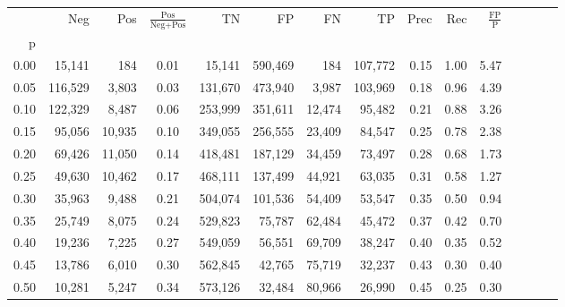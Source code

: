\begin{tabular}{rrrcrrrrrrrrrrr}
\toprule
{} &      Neg &     Pos & $\frac{\text{Pos}}{\text{Neg}+\text{Pos}}$ &       TN &       FP &       FN &       TP &  Prec &   Rec & $\frac{\text{FP}}{\text{P}}$ \\
p    &          &         &                                            &          &          &          &          &       &       &                              \\
\midrule
0.00 &   15,141 &     184 &                                       0.01 &   15,141 &  590,469 &      184 &  107,772 &  0.15 &  1.00 &                         5.47 \\
0.05 &  116,529 &   3,803 &                                       0.03 &  131,670 &  473,940 &    3,987 &  103,969 &  0.18 &  0.96 &                         4.39 \\
0.10 &  122,329 &   8,487 &                                       0.06 &  253,999 &  351,611 &   12,474 &   95,482 &  0.21 &  0.88 &                         3.26 \\
0.15 &   95,056 &  10,935 &                                       0.10 &  349,055 &  256,555 &   23,409 &   84,547 &  0.25 &  0.78 &                         2.38 \\
0.20 &   69,426 &  11,050 &                                       0.14 &  418,481 &  187,129 &   34,459 &   73,497 &  0.28 &  0.68 &                         1.73 \\
0.25 &   49,630 &  10,462 &                                       0.17 &  468,111 &  137,499 &   44,921 &   63,035 &  0.31 &  0.58 &                         1.27 \\
0.30 &   35,963 &   9,488 &                                       0.21 &  504,074 &  101,536 &   54,409 &   53,547 &  0.35 &  0.50 &                         0.94 \\
0.35 &   25,749 &   8,075 &                                       0.24 &  529,823 &   75,787 &   62,484 &   45,472 &  0.37 &  0.42 &                         0.70 \\
0.40 &   19,236 &   7,225 &                                       0.27 &  549,059 &   56,551 &   69,709 &   38,247 &  0.40 &  0.35 &                         0.52 \\
0.45 &   13,786 &   6,010 &                                       0.30 &  562,845 &   42,765 &   75,719 &   32,237 &  0.43 &  0.30 &                         0.40 \\
0.50 &   10,281 &   5,247 &                                       0.34 &  573,126 &   32,484 &   80,966 &   26,990 &  0.45 &  0.25 &                         0.30 \\

\end{tabular}
